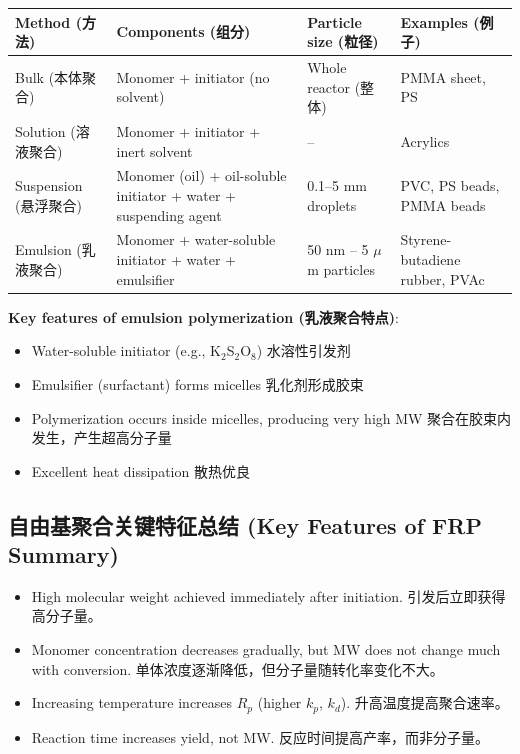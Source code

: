 \documentclass[12pt,a4paper]{ctexart}
\begin{document}
\begin{longtable}{p{3.5cm}p{4cm}p{4cm}p{4cm}}
\toprule
\textbf{Method (方法)} & \textbf{Components (组分)} & \textbf{Particle size (粒径)} & \textbf{Examples (例子)} \\
\midrule
Bulk (本体聚合) & Monomer + initiator (no solvent) & Whole reactor (整体) & PMMA sheet, PS \\
Solution (溶液聚合) & Monomer + initiator + inert solvent & – & Acrylics \\
Suspension (悬浮聚合) & Monomer (oil) + oil-soluble initiator + water + suspending agent & 0.1–5 mm droplets & PVC, PS beads, PMMA beads \\
Emulsion (乳液聚合) & Monomer + water-soluble initiator + water + emulsifier & 50 nm – 5 $\mu$m particles & Styrene-butadiene rubber, PVAc \\
\bottomrule
\end{longtable}

\textbf{Key features of emulsion polymerization (乳液聚合特点)}:
\begin{itemize}
    \item Water-soluble initiator (e.g., K$_2$S$_2$O$_8$) 水溶性引发剂
    \item Emulsifier (surfactant) forms micelles 乳化剂形成胶束
    \item Polymerization occurs inside micelles, producing very high MW 聚合在胶束内发生，产生超高分子量
    \item Excellent heat dissipation 散热优良
\end{itemize}

\subsection{自由基聚合关键特征总结 (Key Features of FRP Summary)}
\begin{itemize}
    \item High molecular weight achieved immediately after initiation.  
    引发后立即获得高分子量。
    \item Monomer concentration decreases gradually, but MW does not change much with conversion.  
    单体浓度逐渐降低，但分子量随转化率变化不大。
    \item Increasing temperature increases $R_p$ (higher $k_p$, $k_d$).  
    升高温度提高聚合速率。
    \item Reaction time increases yield, not MW.  
    反应时间提高产率，而非分子量。
\end{itemize}
\end{document}
